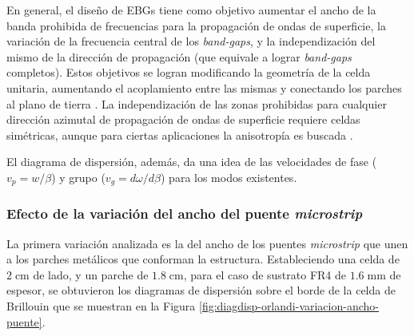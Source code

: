 En general, el diseño de EBGs tiene como objetivo aumentar el ancho de la banda prohibida de frecuencias para la propagación de ondas de superficie, la variación de la frecuencia central de los \textit{band-gaps}, y la independización del mismo de la dirección de propagación (que equivale a lograr \textit{band-gaps} completos). Estos objetivos se logran modificando la geometría de la celda unitaria, aumentando el acoplamiento entre las mismas y conectando los parches al plano de tierra \cite{Marcela:Tesis}. La independización de las zonas prohibidas para cualquier dirección azimutal de propagación de ondas de superficie requiere celdas simétricas, aunque para ciertas aplicaciones la anisotropía es buscada \cite{Maci:Pole-zero-matching}.

El diagrama de dispersión, además, da una idea de las velocidades de fase ($v_p = w/\beta$) y grupo ($v_g = d\omega / d\beta$) para los modos existentes.




\subsubsection{Efecto de la variación del ancho del puente \textit{microstrip}}

La primera variación analizada es la del ancho de los puentes \textit{microstrip} que unen a los parches metálicos que conforman la estructura. Estableciendo una celda de $2\;\text{cm}$ de lado, y un parche de $1.8\;\text{cm}$, para el caso de sustrato FR4 de $1.6\;\text{mm}$ de espesor, se obtuvieron los diagramas de dispersión sobre el borde de la celda de Brillouin que se muestran en la Figura \ref{fig:diagdisp-orlandi-variacion-ancho-puente}.

